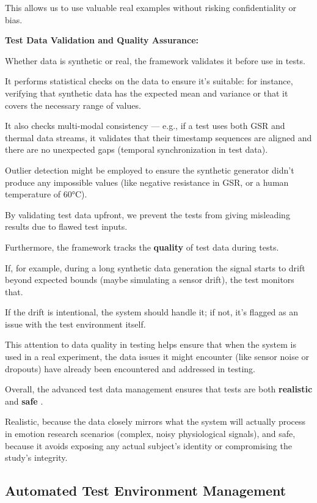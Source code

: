 {{This allows us to use valuable real examples without risking confidentiality or
bias.

\textbf{Test Data Validation and Quality Assurance:}

Whether data is synthetic or real, the framework validates it before use in
tests.

It performs statistical checks on the data to ensure it's suitable: for
instance, verifying that synthetic data has the expected mean and variance or
that it covers the necessary range of values.

It also checks multi-modal consistency --- e.g., if a test uses both GSR and
thermal data streams, it validates that their timestamp sequences are aligned
and there are no unexpected gaps (temporal synchronization in test data).

Outlier detection might be employed to ensure the synthetic generator didn't
produce any impossible values (like negative resistance in GSR, or a human
temperature of 60°C).

By validating test data upfront, we prevent the tests from giving misleading
results due to flawed test inputs.

Furthermore, the framework tracks the \textbf{quality}
 of test data during tests.

If, for example, during a long synthetic data generation the signal starts to
drift beyond expected bounds (maybe simulating a sensor drift), the test
monitors that.

If the drift is intentional, the system should handle it; if not, it's flagged
as an issue with the test environment itself.

This attention to data quality in testing helps ensure that when the system is
used in a real experiment, the data issues it might encounter (like sensor noise
or dropouts) have already been encountered and addressed in testing.

Overall, the advanced test data management ensures that tests are both \textbf{realistic}
 and \textbf{safe}
.

Realistic, because the data closely mirrors what the system will actually
process in emotion research scenarios (complex, noisy physiological signals),
and safe, because it avoids exposing any actual subject's identity or
compromising the study's integrity.

\subsection{Automated Test Environment Management}

}}
